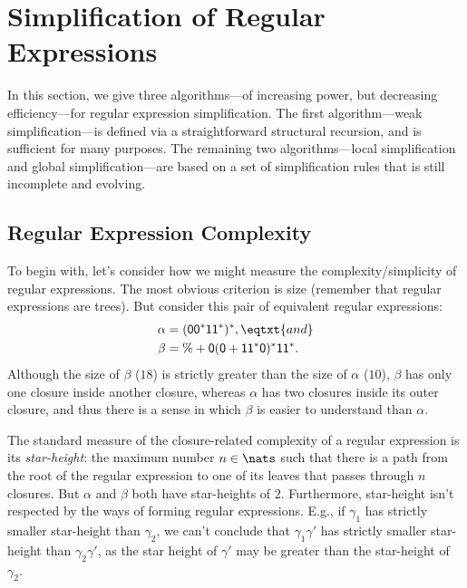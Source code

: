 \section{Simplification of Regular Expressions}
\label{SimplificationOfRegularExpressions}

%
%
In this section, we give three algorithms---of increasing power, but
decreasing efficiency---for regular expression simplification.  The
first algorithm---weak simplification---is defined via a
straightforward structural recursion, and is sufficient for many
purposes.  The remaining two algorithms---local simplification and
global simplification---are based on a set of simplification rules
that is still incomplete and evolving.

\subsection{Regular Expression Complexity}

To begin with, let's consider how we might measure the
complexity/simplicity of regular expressions.  The most obvious
criterion is size (remember that regular expressions are trees).
But consider this pair of equivalent regular expressions:
\begin{align*}
\alpha &= \mathsf{(00^*11^*)^*} , \eqtxt{and} \\
\beta &= \mathsf{\% + 0(0 + 11^*0)^*11^*} .
\end{align*}
Although the size of $\beta$ ($18$) is strictly greater than the
size of $\alpha$ ($10$), $\beta$ has only one closure inside another
closure, whereas $\alpha$ has two closures inside its outer closure,
and thus there is a sense in which $\beta$ is easier to understand
than $\alpha$.

The standard measure of the closure-related complexity
of a regular expression is its \emph{star-height}: the maximum number
$n\in\nats$ such that there is a path from the root of the regular expression
to one of its leaves that passes through $n$ closures.  But $\alpha$ and
$\beta$ both have star-heights of $2$.  Furthermore, star-height
isn't respected by the ways of forming regular expressions.  E.g.,
if $\gamma_1$ has strictly smaller star-height than $\gamma_2$,
we can't conclude that $\gamma_1\gamma'$ has strictly smaller star-height
than $\gamma_2\gamma'$, as the star height of $\gamma'$ may be
greater than the star-height of $\gamma_2$.

